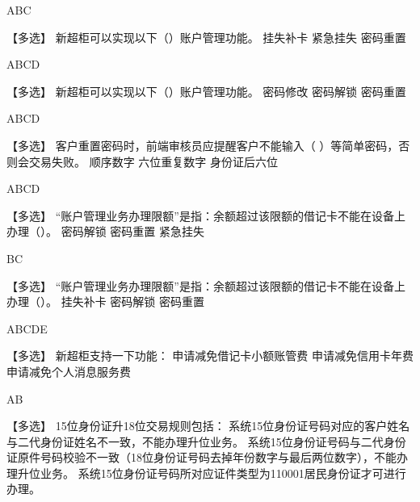 \documentclass[kindlepaper]{BHCexam4kindle}
\begin{document}
\begin{questions}
\begin{solution} ABC \end{solution}
\qs 【多选】 新超柜可以实现以下（）账户管理功能。 \xx
{} {  挂失补卡 } { 紧急挂失 } { 密码重置 }
\begin{solution} ABCD \end{solution}
\qs 【多选】 新超柜可以实现以下（）账户管理功能。 \xx
{} {  密码修改 } { 密码解锁 } { 密码重置 }
\begin{solution} ABCD \end{solution}
\qs 【多选】 客户重置密码时，前端审核员应提醒客户不能输入（  ）等简单密码，否则会交易失败。 \xx
{} {  顺序数字 } { 六位重复数字 } { 身份证后六位 }
\begin{solution} ABCD \end{solution}
\qs 【多选】 “账户管理业务办理限额”是指：余额超过该限额的借记卡不能在设备上办理（）。 \xx
{} {  密码解锁 } { 密码重置 } { 紧急挂失 }
\begin{solution} BC \end{solution}
\qs 【多选】 “账户管理业务办理限额”是指：余额超过该限额的借记卡不能在设备上办理（）。 \xx
{} {  挂失补卡 } { 密码解锁 } { 密码重置 }
\begin{solution} ABCDE \end{solution}
\qs 【多选】 新超柜支持一下功能： \xx
{} {  申请减免借记卡小额账管费 } { 申请减免信用卡年费 } { 申请减免个人消息服务费 }
\begin{solution} AB \end{solution}
\qs 【多选】 15位身份证升18位交易规则包括： \xx
{} {  系统15位身份证号码对应的客户姓名与二代身份证姓名不一致，不能办理升位业务。 } { 系统15位身份证号码与二代身份证原件号码校验不一致（18位身份证号码去掉年份数字与最后两位数字），不能办理升位业务。 } { 系统15位身份证号码所对应证件类型为110001居民身份证才可进行办理。 }

\end{questions}
\end{document}
